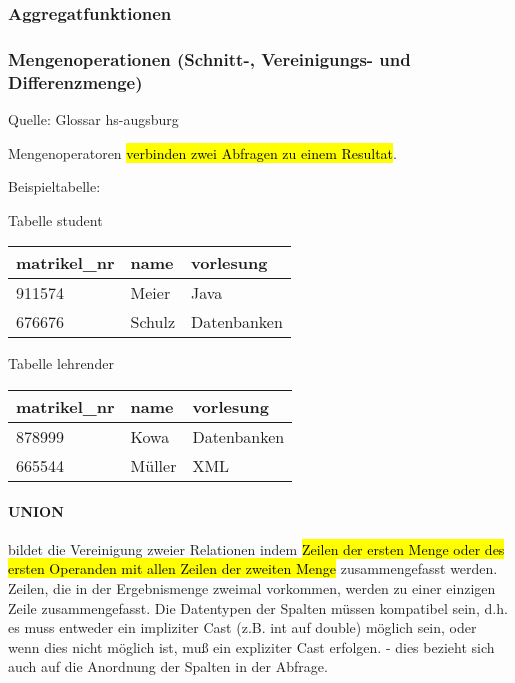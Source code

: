 
\subsubsection{Aggregatfunktionen}
\label{sec:Aggregatfunktionen}


\subsubsection{Mengenoperationen (Schnitt-, Vereinigungs- und Differenzmenge)}
\label{sec:Mengenoperationen}

Quelle: Glossar hs-augsburg \cite{mengenoperationHsaugsburg}

Mengenoperatoren \hl{verbinden zwei Abfragen zu einem Resultat}.

Beispieltabelle: \\

\begin{minipage}{0.45\textwidth}
	\begin{center}
		Tabelle student \\
		\vspace{1em}
		\bgroup
		\setlength{\tabcolsep}{1em}
		\def\arraystretch{1.5}
		\begin{tabular}{l l l}
			\rowcolor{tableLightGray}matrikel\_nr & name & vorlesung \\
			\hline
			911574 & Meier & Java \\
			676676 & Schulz & Datenbanken
		\end{tabular}
		\egroup
	\end{center}
\end{minipage}
\hfill
\begin{minipage}{0.45\textwidth}
	\begin{center}
		Tabelle lehrender \\
		\vspace{1em}
		\bgroup
		\setlength{\tabcolsep}{1em}
		\def\arraystretch{1.5}
		\begin{tabular}{l l l}
			\rowcolor{tableLightGray}matrikel\_nr & name & vorlesung \\
			\hline
			878999 & Kowa & Datenbanken \\
			665544 & Müller & XML
		\end{tabular}
		\egroup
	\end{center}
\end{minipage}


\paragraph{UNION} bildet die Vereinigung zweier Relationen indem \hl{Zeilen der ersten Menge oder des ersten Operanden mit allen Zeilen der zweiten Menge} zusammengefasst werden. Zeilen, die in der Ergebnismenge zweimal vorkommen, werden zu einer einzigen Zeile zusammengefasst. Die Datentypen der Spalten müssen kompatibel sein, d.h. es muss entweder ein impliziter Cast (z.B. int auf double) möglich sein, oder wenn dies nicht möglich ist, muß ein expliziter Cast erfolgen. - dies bezieht sich auch auf die Anordnung der Spalten in der Abfrage.

